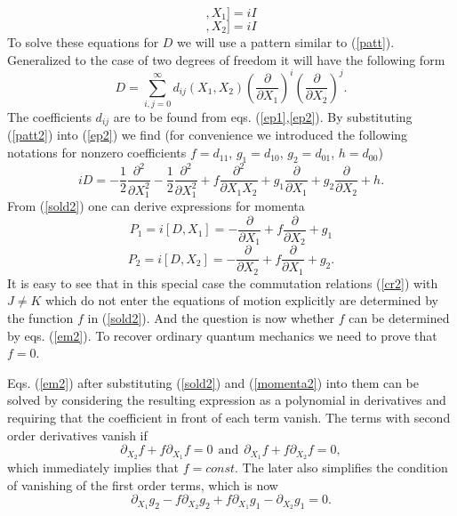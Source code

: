 \documentclass[a4paper,11pt]{article}
\begin{document}
\begin{displaymath}
 [ [D,X_1 ],X_1 ]=iI
\end{displaymath}
\begin{equation}
 [ [D,X_2 ],X_2 ]=iI \label{ep2}
\end{equation}
To solve these equations for $D$ we will use a pattern similar to
(\ref{patt}). Generalized to the case of two degrees of freedom it
will have the following form
\begin{equation}
D= \sum\limits_{i,j=0}^{\infty} d_{ij}(X_1,X_2)
\left(\frac{\partial}{\partial X_1}\right)^i
\left(\frac{\partial}{\partial X_2}\right)^j. \label{patt2}
\end{equation}
The coefficients $d_{ij}$ are to be found from eqs.
(\ref{ep1},\ref{ep2}). By substituting (\ref{patt2}) into
(\ref{ep2}) we find (for convenience we introduced the following
notations for nonzero coefficients $f=d_{11}$, $g_1=d_{10}$,
$g_2=d_{01}$, $h=d_{00}$)
\begin{equation}
iD=-\frac{1}{2}\frac{\partial^2}{\partial X_1^2}-
\frac{1}{2}\frac{\partial^2}{\partial X_1^2}+
f\frac{\partial^2}{\partial X_1 X_2 }+ g_1\frac{\partial}{\partial
X_1}+ g_2\frac{\partial}{\partial X_2}+h. \label{sold2}
\end{equation}
From (\ref{sold2}) one can derive expressions for momenta
\begin{displaymath}
P_1=i[D,X_1]=-\frac{\partial}{\partial  X_1}
+f\frac{\partial}{\partial  X_2}+g_1
\end{displaymath}
\begin{equation}
P_2=i[D,X_2]=-\frac{\partial}{\partial  X_2}
+f\frac{\partial}{\partial  X_1}+g_2. \label{momenta2}
\end{equation}
It is easy to see that in this special case the commutation
relations (\ref{cr2}) with $J\not=K$ which do not enter the
equations of motion explicitly are determined by the function $f$
in (\ref{sold2}). And the question is now whether $f$ can be
determined by eqs. (\ref{em2}). To recover ordinary quantum
mechanics we need to prove that $f=0$.

Eqs. (\ref{em2}) after substituting (\ref{sold2}) and
(\ref{momenta2}) into them can be solved by considering the
resulting expression as a polynomial in derivatives and requiring
that the coefficient in front of each term vanish. The terms with
second order derivatives vanish if
\begin{equation}
\partial_{X_2}f + f\partial_{X_1}f=0 \ \ \mbox{and}  \ \
\partial_{X_1}f + f\partial_{X_2}f=0,
\end{equation}
which immediately implies that $f=const$. The later also
simplifies the condition of vanishing of the first order terms,
which is now
\begin{equation}
\partial_{X_1}g_2-f\partial_{X_2}g_2+f\partial_{X_1}g_1-\partial_{X_2}g_1=0.
\label{or1con}
\end{equation}
\end{document}
